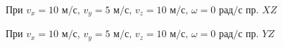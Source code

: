 \documentclass[a5paper, 10pt]{article}
\theoremstyle{definition}
\theoremstyle{plain}
\theoremstyle{remark}
\begin{document}
\begin{figure}[h]
	           \caption{При $v_x = 10 \text{ м/с}, \, v_y = 5  \text{ м/с}, \, v_z = 10  \text{ м/с}, \, \omega = 0 \text{ рад/с}$ пр. $XZ$}
\end{figure}

\begin{figure}[h]
	           \caption{При $v_x = 10 \text{ м/с}, \, v_y = 5  \text{ м/с}, \, v_z = 10  \text{ м/с}, \, \omega = 0 \text{ рад/с}$ пр. $YZ$}
\end{figure}
\end{document}
